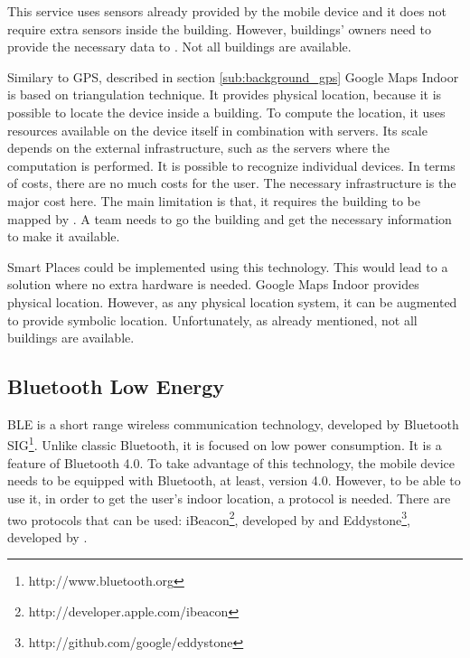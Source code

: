 This service uses sensors already provided by the mobile device and it does not require extra sensors inside the building.
However, buildings' owners need to provide the necessary data to .
Not all buildings are available.

Similary to \gls{GPS}, described in section \ref{sub:background_gps} Google Maps Indoor is based on triangulation technique.
It provides physical location, because it is possible to locate the device inside a building.
To compute the location, it uses resources available on the device itself in combination with servers.
Its scale depends on the external infrastructure, such as the servers where the computation is performed.
It is possible to recognize individual devices.
In terms of costs, there are no much costs for the user. The necessary infrastructure is the major cost here.
The main limitation is that, it requires the building to be mapped by . A team needs to go the building and get the necessary information to make it available.

Smart Places could be implemented using this technology.
This would lead to a solution where no extra hardware is needed.
Google Maps Indoor provides physical location. However, as any physical location system, it can be augmented to provide symbolic location.
Unfortunately, as already mentioned, not all buildings are available.

\subsection{Bluetooth Low Energy}
\label{sub:background_bluetooth_low_energy}
\gls{BLE}\cite{ble} is a short range wireless communication technology, developed by Bluetooth \gls{SIG}\footnote{http://www.bluetooth.org}.
Unlike classic Bluetooth, it is focused on low power consumption.
It is a feature of Bluetooth 4.0\cite{bluetooth_specification}.
To take advantage of this technology, the mobile device needs to be equipped with Bluetooth, at least, version 4.0.
However, to be able to use it, in order to get the user's indoor location, a protocol is needed.
There are two protocols that can be used: iBeacon\footnote{http://developer.apple.com/ibeacon}, developed by  and Eddystone\footnote{http://github.com/google/eddystone}, developed by .

